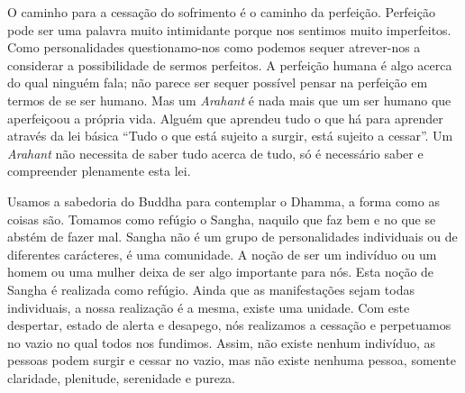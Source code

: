 O caminho para a cessação do sofrimento é o caminho da perfeição. Perfeição pode
ser uma palavra muito intimidante porque nos sentimos muito imperfeitos. Como
personalidades questionamo-nos como podemos sequer atrever-nos a considerar a
possibilidade de sermos perfeitos. A perfeição humana é algo acerca do qual
ninguém fala; não parece ser sequer possível pensar na perfeição em termos de se
ser humano. Mas um \emph{Arahant} é nada mais que um ser humano que aperfeiçoou
a própria vida. Alguém que aprendeu tudo o que há para aprender através da lei
básica “Tudo o que está sujeito a surgir, está sujeito a cessar”. Um
\emph{Arahant} não necessita de saber tudo acerca de tudo, só é necessário saber
e compreender plenamente esta lei.

Usamos a sabedoria do Buddha para contemplar o Dhamma, a forma como as coisas
são. Tomamos como refúgio o Sangha, naquilo que faz bem e no que se abstém de
fazer mal. Sangha não é um grupo de personalidades individuais ou de diferentes
carácteres, é uma comunidade. A noção de ser um indivíduo ou um homem ou uma
mulher deixa de ser algo importante para nós. Esta noção de Sangha é realizada
como refúgio. Ainda que as manifestações sejam todas individuais, a nossa
realização é a mesma, existe uma unidade. Com este despertar, estado de alerta e
desapego, nós realizamos a cessação e perpetuamos no vazio no qual todos nos
fundimos. Assim, não existe nenhum indivíduo, as pessoas podem surgir e cessar
no vazio, mas não existe nenhuma pessoa, somente claridade, plenitude,
serenidade e pureza.

